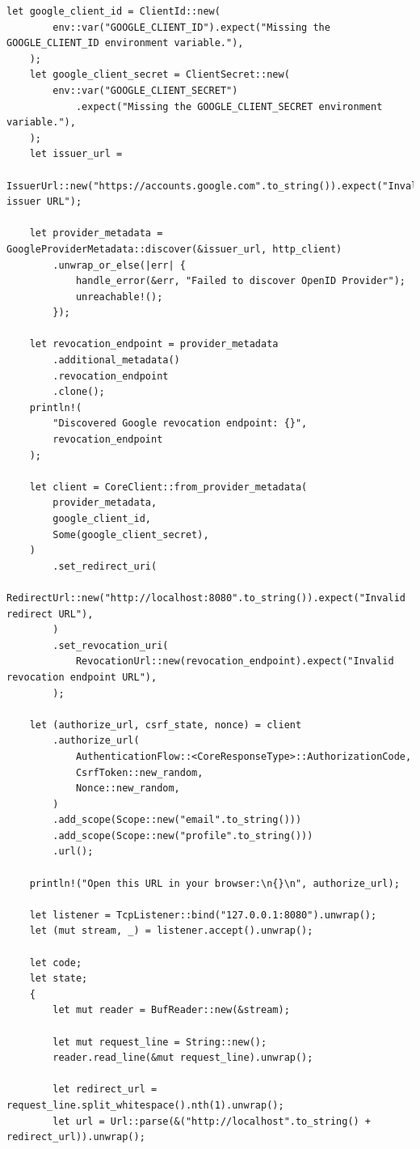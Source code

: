\documentclass[notitlepage, hidelinks]{article}
\begin{document}
\begin{lstlisting}[language={[Sharp]C},frame=single,caption=OAuth2 und OICD in Rust,label=owaspfivegood]
    let google_client_id = ClientId::new(
        env::var("GOOGLE_CLIENT_ID").expect("Missing the GOOGLE_CLIENT_ID environment variable."),
    );
    let google_client_secret = ClientSecret::new(
        env::var("GOOGLE_CLIENT_SECRET")
            .expect("Missing the GOOGLE_CLIENT_SECRET environment variable."),
    );
    let issuer_url =
        IssuerUrl::new("https://accounts.google.com".to_string()).expect("Invalid issuer URL");

    let provider_metadata = GoogleProviderMetadata::discover(&issuer_url, http_client)
        .unwrap_or_else(|err| {
            handle_error(&err, "Failed to discover OpenID Provider");
            unreachable!();
        });

    let revocation_endpoint = provider_metadata
        .additional_metadata()
        .revocation_endpoint
        .clone();
    println!(
        "Discovered Google revocation endpoint: {}",
        revocation_endpoint
    );

    let client = CoreClient::from_provider_metadata(
        provider_metadata,
        google_client_id,
        Some(google_client_secret),
    )
        .set_redirect_uri(
            RedirectUrl::new("http://localhost:8080".to_string()).expect("Invalid redirect URL"),
        )
        .set_revocation_uri(
            RevocationUrl::new(revocation_endpoint).expect("Invalid revocation endpoint URL"),
        );

    let (authorize_url, csrf_state, nonce) = client
        .authorize_url(
            AuthenticationFlow::<CoreResponseType>::AuthorizationCode,
            CsrfToken::new_random,
            Nonce::new_random,
        )
        .add_scope(Scope::new("email".to_string()))
        .add_scope(Scope::new("profile".to_string()))
        .url();

    println!("Open this URL in your browser:\n{}\n", authorize_url);

    let listener = TcpListener::bind("127.0.0.1:8080").unwrap();
    let (mut stream, _) = listener.accept().unwrap();

    let code;
    let state;
    {
        let mut reader = BufReader::new(&stream);

        let mut request_line = String::new();
        reader.read_line(&mut request_line).unwrap();

        let redirect_url = request_line.split_whitespace().nth(1).unwrap();
        let url = Url::parse(&("http://localhost".to_string() + redirect_url)).unwrap();


\end{lstlisting}
\end{document}

